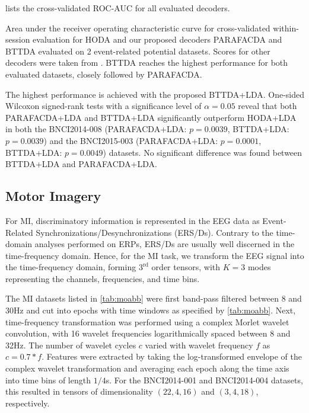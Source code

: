  lists the cross-validated ROC-AUC for all evaluated
decoders.
\begin{table}[t]
	\footnotesize
	\centering
	
  \caption[Within-session classification score for 2 event-related potential
  datasets.]{Area under the receiver operating characteristic curve for
		cross-validated within-session evaluation for HODA and our proposed decoders
		PARAFACDA and BTTDA evaluated on 2 event-related potential datasets.
    Scores for other decoders were taken from \cite{Chevallier2024}.
		BTTDA reaches the highest performance for both evaluated datasets, closely
		followed by PARAFACDA.
	}
	\label{tab:erp-score}
\end{table}
The highest performance is achieved with the proposed BTTDA+LDA.
One-sided Wilcoxon signed-rank tests with a significance level of $\alpha=0.05$
reveal that both PARAFACDA+LDA and BTTDA+LDA significantly outperform
HODA+LDA in both the BNCI2014-008 (PARAFACDA+LDA: $p=0.0039$, BTTDA+LDA:
$p=0.0039$) and the BNCI2015-003 (PARAFACDA+LDA: $p=0.0001$, BTTDA+LDA:
$p=0.0049$) datasets.
No significant difference was found between BTTDA+LDA and PARAFACDA+LDA.


\subsection{Motor Imagery}
For MI, discriminatory information is represented in the EEG data as
Event-Related Synchronizations/Desynchronizations (ERS/Ds).
Contrary to the time-domain analyses performed on ERPs, ERS/Ds are usually well
discerned in the time-frequency domain.
Hence, for the MI task, we transform the EEG signal into the
time-frequency domain, forming $3^\text{rd}$ order tensors, with $K=3$ modes
representing the channels, frequencies, and time bins.

The MI datasets listed in \cref{tab:moabb} were first band-pass filtered
between 8 and 30Hz and cut into
epochs with time windows as specified by \cref{tab:moabb}.
Next, time-frequency transformation was performed using a complex Morlet wavelet
convolution, with 16 wavelet frequencies logarithmically spaced between 8 and
32Hz.
The number of wavelet cycles $c$ varied with wavelet frequency $f$ as
$c=0.7*f$.
Features were extracted by taking the log-transformed envelope of the complex
wavelet transformation and averaging each epoch along the time axis into time bins of
length $1/4$s.
For the BNCI2014-001 and BNCI2014-004 datasets, this resulted in tensors of dimensionality
$(22, 4, 16)$ and $(3, 4, 18)$, respectively.

